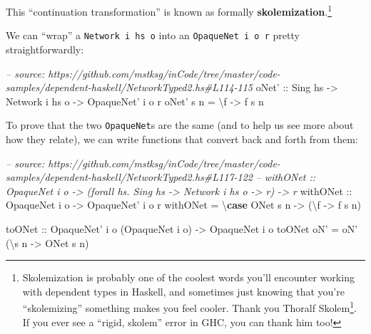 \documentclass[]{article}
\newenvironment{Shaded}{}{}
\newcommand{\KeywordTok}[1]{\textcolor[rgb]{0.00,0.44,0.13}{\textbf{{#1}}}}
\newcommand{\DataTypeTok}[1]{\textcolor[rgb]{0.56,0.13,0.00}{{#1}}}
\newcommand{\CommentTok}[1]{\textcolor[rgb]{0.38,0.63,0.69}{\textit{{#1}}}}
\newcommand{\OtherTok}[1]{\textcolor[rgb]{0.00,0.44,0.13}{{#1}}}
\newcommand{\FunctionTok}[1]{\textcolor[rgb]{0.02,0.16,0.49}{{#1}}}
\newcommand{\NormalTok}[1]{{#1}}
\renewcommand{\href}[2]{#2\footnote{\url{#1}}}
\begin{document}
This ``continuation transformation'' is known as formally
\textbf{skolemization}.\footnote{Skolemization is probably one of the coolest
  words you'll encounter working with dependent types in Haskell, and sometimes
  just knowing that you're ``skolemizing'' something makes you feel cooler.
  Thank you \href{https://en.wikipedia.org/wiki/Thoralf_Skolem}{Thoralf Skolem}.
  If you ever see a ``rigid, skolem'' error in GHC, you can thank him too!}

We can ``wrap'' a \texttt{Network\ i\ hs\ o} into an
\texttt{OpaqueNet\textquotesingle{}\ i\ o\ r} pretty straightforwardly:

\begin{Shaded}
\begin{Highlighting}[]
\CommentTok{-- source: https://github.com/mstksg/inCode/tree/master/code-samples/dependent-haskell/NetworkTyped2.hs#L114-115}
\OtherTok{oNet' ::} \DataTypeTok{Sing} \NormalTok{hs }\OtherTok{->} \DataTypeTok{Network} \NormalTok{i hs o }\OtherTok{->} \DataTypeTok{OpaqueNet'} \NormalTok{i o r}
\NormalTok{oNet' s n }\FunctionTok{=} \NormalTok{\textbackslash{}f }\OtherTok{->} \NormalTok{f s n}
\end{Highlighting}
\end{Shaded}

To prove that the two \texttt{OpaqueNet}s are the same (and to help us see more
about how they relate), we can write functions that convert back and forth from
them:

\begin{Shaded}
\begin{Highlighting}[]
\CommentTok{-- source: https://github.com/mstksg/inCode/tree/master/code-samples/dependent-haskell/NetworkTyped2.hs#L117-122}
\CommentTok{-- withONet :: OpaqueNet i o -> (forall hs. Sing hs -> Network i hs o -> r) -> r}
\OtherTok{withONet ::} \DataTypeTok{OpaqueNet} \NormalTok{i o }\OtherTok{->} \DataTypeTok{OpaqueNet'} \NormalTok{i o r}
\NormalTok{withONet }\FunctionTok{=} \NormalTok{\textbackslash{}}\KeywordTok{case} \DataTypeTok{ONet} \NormalTok{s n }\OtherTok{->} \NormalTok{(\textbackslash{}f }\OtherTok{->} \NormalTok{f s n)}

\OtherTok{toONet ::} \DataTypeTok{OpaqueNet'} \NormalTok{i o (}\DataTypeTok{OpaqueNet} \NormalTok{i o) }\OtherTok{->} \DataTypeTok{OpaqueNet} \NormalTok{i o}
\NormalTok{toONet oN' }\FunctionTok{=} \NormalTok{oN' (\textbackslash{}s n }\OtherTok{->} \DataTypeTok{ONet} \NormalTok{s n)}
\end{Highlighting}
\end{Shaded}
\end{document}
